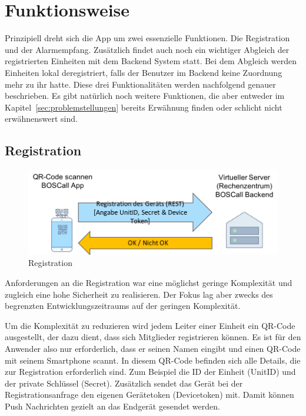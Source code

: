 \section{Funktionsweise}
\label{sec:funktionsweise}
Prinzipiell dreht sich die App um zwei essenzielle Funktionen. Die Registration und der Alarmempfang. Zusätzlich findet auch noch ein wichtiger Abgleich der registrierten Einheiten mit dem Backend System statt. Bei dem Abgleich werden Einheiten lokal deregistriert, falls der Benutzer im Backend keine Zuordnung mehr zu ihr hatte. Diese drei Funktionalitäten werden nachfolgend genauer beschrieben. Es gibt natürlich noch weitere Funktionen, die aber entweder im Kapitel~\ref{sec:problemstellungen} bereits Erwähnung finden oder schlicht nicht erwähnenswert sind.
\subsection{Registration}
\begin{figure}[H]
	\centering
	\includegraphics[width=\linewidth]{include/img/registration}
	\caption{Registration}
	\label{fig:registration}
\end{figure}
Anforderungen an die Registration war eine möglichst geringe Komplexität und zugleich eine hohe Sicherheit zu realisieren. Der Fokus lag aber zwecks des begrenzten Entwicklungszeitraums auf der geringen Komplexität.

Um die Komplexität zu reduzieren wird jedem Leiter einer Einheit ein QR-Code ausgestellt, der dazu dient, dass sich Mitglieder registrieren können. Es ist für den Anwender also nur erforderlich, dass er seinen Namen eingibt und einen QR-Code mit seinem Smartphone scannt. In diesem QR-Code befinden sich alle Details, die zur Registration erforderlich sind. Zum Beispiel die ID der Einheit (UnitID) und der private Schlüssel (Secret). Zusätzlich sendet das Gerät bei der Registrationsanfrage den eigenen Gerätetoken (Devicetoken) mit. Damit können Push Nachrichten gezielt an das Endgerät gesendet werden.

